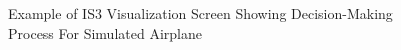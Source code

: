 \documentclass[11pt]{proposalnsf}
\newcommand{\dan}[1]{\textcolor{blue}{{\it [Dan says: #1]}}}
\newcommand{\stephen}[1]{\textcolor{red}{{\it [Stephen: #1]}}}
\begin{document}
\begin{sloppypar}
\begin{enumerate}[noitemsep]
\begin{figure}[h]
	\centering
    \caption{Example of IS3 Visualization Screen Showing Decision-Making Process For Simulated Airplane}
    \label{fig:educationalFlying}
\end{figure}












\end{enumerate}








\end{sloppypar}
\end{document}
